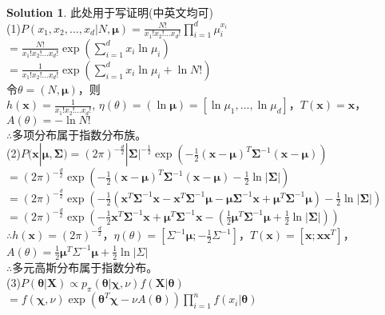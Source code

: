 \documentclass[a4paper,UTF8]{article}
\numberwithin{equation}{section}
\theoremstyle{definition}
\newtheorem*{solution}{Solution}
\begin{document}
\begin{solution}
此处用于写证明(中英文均可)\\
(1)$P(x_1,x_2,...,x_d | N, \boldsymbol{\mu}) = \frac{N!}{x_1!x_2!...x_d!} \prod_{i=1}^d \mu_i^{x_i}$\\
$= \frac{N!}{x_1!x_2!...x_d!} \exp(\sum_{i=1}^d x_i \ln \mu_i)$\\
$= \frac{1}{x_1!x_2!...x_d!} \exp(\sum_{i=1}^d x_i \ln \mu_i + \ln N!)$\\
令$\theta = (N, \boldsymbol{\mu})$，则\\
$h(\mathbf{x}) = \frac{1}{x_1!x_2!...x_d!}$, $\eta(\theta) = (\ln \boldsymbol{\mu}) = [\ln \mu_1 ,..., \ln \mu_d ]$，$T(\mathbf{x}) = \mathbf{x}$，$A(\theta) = - \ln N!$\\
$\therefore$多项分布属于指数分布族。\\
(2)$P(\mathbf{x} | \boldsymbol{\mu}, \mathbf{\Sigma}) = (2\pi)^{-\frac{d}{2}} |\mathbf{\Sigma}|^{-\frac{1}{2}} \exp(-\frac{1}{2} (\mathbf{x}-\boldsymbol{\mu})^T \mathbf{\Sigma}^{-1} (\mathbf{x}-\boldsymbol{\mu}))$\\
$=(2\pi)^{-\frac{d}{2}} \exp( -\frac{1}{2} (\mathbf{x}-\boldsymbol{\mu})^T \mathbf{\Sigma}^{-1} (\mathbf{x}-\boldsymbol{\mu}) - \frac{1}{2}\ln |\mathbf{\Sigma}| )$\\
$=(2\pi)^{-\frac{d}{2}} \exp( -\frac{1}{2} (\mathbf{x}^T\mathbf{\Sigma}^{-1}\mathbf{x} - \mathbf{x}^T\mathbf{\Sigma}^{-1}\boldsymbol{\mu} - \boldsymbol{\mu}\mathbf{\Sigma}^{-1}\mathbf{x} + \boldsymbol{\mu}^T \mathbf{\Sigma}^{-1}\boldsymbol{\mu} ) - \frac{1}{2}\ln |\mathbf{\Sigma}|)$\\
$=(2\pi)^{-\frac{d}{2}} \exp( -\frac{1}{2}\mathbf{x}^T\mathbf{\Sigma}^{-1}\mathbf{x} + \boldsymbol{\mu}^T \mathbf{\Sigma}^{-1} \mathbf{x} -(\frac{1}{2}\boldsymbol{\mu}^T \mathbf{\Sigma}^{-1}\boldsymbol{\mu}+\frac{1}{2}\ln |\mathbf{\Sigma}|) )$\\
$\therefore h(\mathbf{x}) = (2\pi)^{-\frac{d}{2}}$，$\eta(\theta) = [\Sigma^{-1}\boldsymbol\mu; -\frac{1}{2}\Sigma^{-1}]$，$T(\mathbf{x}) = [\mathbf{x}; \mathbf{x}\mathbf{x}^T]$，$A(\theta) = \frac{1}{2}\boldsymbol\mu^T \Sigma^{-1} \boldsymbol\mu + \frac{1}{2}\ln | \Sigma|$\\
$\therefore$多元高斯分布属于指数分布。\\
(3)$P(\boldsymbol{\theta} | \mathbf{X}) \propto p_{\pi} (\boldsymbol\theta | \boldsymbol\chi, \nu) f(\mathbf{X} | \boldsymbol\theta)$\\
$= f(\boldsymbol\chi,\nu)\exp(\boldsymbol\theta^T\boldsymbol\chi-\nu A(\boldsymbol\theta)) \prod_{i=1}^n f(x_i | \boldsymbol\theta)$\\

\end{solution}
\end{document}
